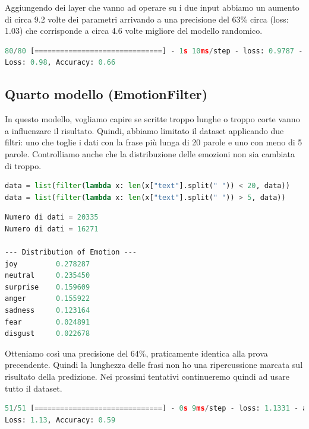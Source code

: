 \documentclass{article}
\begin{document}
Aggiungendo dei layer che vanno ad operare su i due input abbiamo un aumento di circa 9.2 volte dei parametri arrivando a una precisione del 63\% circa (loss: 1.03) che corrisponde a circa 4.6 volte migliore del modello randomico.

\begin{lstlisting}[language=Python, caption=Risultati terzo modello]
80/80 [==============================] - 1s 10ms/step - loss: 0.9787 - accuracy: 0.6604 - precision_14: 0.7538 - recall_14: 0.5608
Loss: 0.98, Accuracy: 0.66
\end{lstlisting}


\subsection{Quarto modello (EmotionFilter)}
In questo modello, vogliamo capire se scritte troppo lunghe o troppo corte vanno a influenzare il risultato. Quindi, abbiamo limitato il dataset applicando due filtri: uno che toglie i dati con la frase più lunga di 20 parole e uno con meno di 5 parole. Controlliamo anche che la distribuzione delle emozioni non sia cambiata di troppo.
\begin{lstlisting}[language=Python, caption=Riduzione parametri tramite filtri]
data = list(filter(lambda x: len(x["text"].split(" ")) < 20, data))
data = list(filter(lambda x: len(x["text"].split(" ")) > 5, data))
\end{lstlisting}

\bigskip

\begin{lstlisting}[language=Python, caption=Distribuzione emozioni]
Numero di dati = 20335
Numero di dati = 16271

--- Distribution of Emotion ---
joy         0.278287
neutral     0.235450
surprise    0.159609
anger       0.155922
sadness     0.123164
fear        0.024891
disgust     0.022678
\end{lstlisting}

Otteniamo così una precisione del $64\%$, praticamente identica alla prova precendente. Quindi la lunghezza delle frasi non ho una ripercussione marcata sul risultato della predizione. Nei prossimi tentativi continueremo quindi ad usare tutto il dataset.
\begin{lstlisting}[language=Python, caption=Risultati quarto modello]
51/51 [==============================] - 0s 9ms/step - loss: 1.1331 - accuracy: 0.5950 - precision_15: 0.7474 - recall_15: 0.4474
Loss: 1.13, Accuracy: 0.59
\end{lstlisting}
\end{document}
